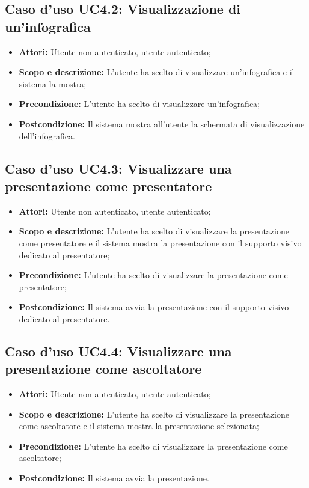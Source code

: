 \subsection{Caso d'uso UC4.2: Visualizzazione di un'infografica}
\begin{itemize}
	\item \textbf{Attori:} Utente non autenticato, utente autenticato;
	\item \textbf{Scopo e descrizione:} L'utente ha scelto di visualizzare un'\gls{infografica} e il sistema la mostra;
	\item \textbf{Precondizione:} L'utente ha scelto di visualizzare un'\gls{infografica};
	\item \textbf{Postcondizione:} Il sistema mostra all'utente la schermata di visualizzazione dell'\gls{infografica}.
\end{itemize}


\subsection{Caso d'uso UC4.3: Visualizzare una presentazione come presentatore}
\begin{itemize}
	\item \textbf{Attori:} Utente non autenticato, utente autenticato;
	\item \textbf{Scopo e descrizione:} L'utente ha scelto di visualizzare la presentazione come presentatore e il sistema mostra la presentazione con il supporto visivo dedicato al presentatore;
	\item \textbf{Precondizione:} L'utente ha scelto di visualizzare la presentazione come presentatore;
	\item \textbf{Postcondizione:} Il sistema avvia la presentazione con il supporto visivo dedicato al presentatore.
\end{itemize}


\subsection{Caso d'uso UC4.4: Visualizzare una presentazione come ascoltatore}
\begin{itemize}
	\item \textbf{Attori:} Utente non autenticato, utente autenticato;
	\item \textbf{Scopo e descrizione:} L'utente ha scelto di visualizzare la presentazione come ascoltatore e il sistema mostra la presentazione selezionata;
	\item \textbf{Precondizione:} L'utente ha scelto di visualizzare la presentazione come ascoltatore;
	\item \textbf{Postcondizione:} Il sistema avvia la presentazione.
\end{itemize}